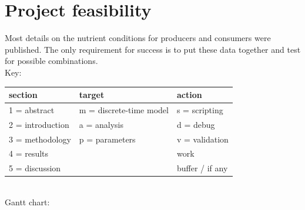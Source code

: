\documentclass[a4paper, 11pt]{article}
\begin{document}
\section{Project feasibility}
Most details on the nutrient conditions for producers\autocite{duarte2009microbial,markou2014microalgal} and consumers\autocite{neff1957purification,mooshammer2014stoichiometric} were published.  The only requirement for success is to put these data together and test for possible combinations.\\
Key:
\begin{tabular}{lll}
	section & target & action\\\hline
	1 = abstract & m = discrete-time model & s = scripting\\
	2 = introduction & a = analysis & d = debug\\
	3 = methodology & p = parameters & v = validation\\
	4 = results && \cellcolor{grey90}work\\
	5 = discussion && \cellcolor{lorange}buffer / if any\\
\end{tabular}\\
Gantt chart:\\
\end{document}
